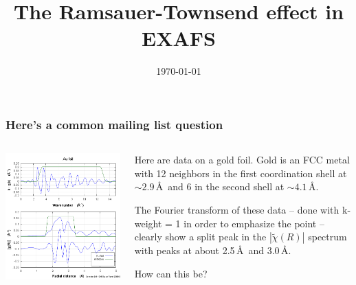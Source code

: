 \documentclass[10pt, xcolor=x11names, compress]{beamer}
\title{The Ramsauer-Townsend effect in EXAFS}
\date{\today}
\begin{document}
\maketitle


\begin{frame}
  \frametitle{Here's a common mailing list question}

  \begin{columns}[T]
    \begin{column}{0.5\linewidth}
      \includegraphics[width=\linewidth]{Au_rk.png}
    \end{column}
    \begin{column}{0.5\linewidth}
      Here are data on a gold foil.  Gold is an FCC metal with 12
      neighbors in the first coordination shell at $\sim2.9$\,\AA\
      and 6 in the second shell at $\sim4.1$\,\AA.

      \bigskip

      The Fourier transform of these data -- done with k-weight = 1 in
      order to emphasize the point -- clearly show a split peak in the
      $|\tilde\chi(R)|$ spectrum with peaks at about 2.5\,\AA\ and
      3.0\,\AA.

      \bigskip

      \begin{alertblock}{}
        \centering How can this be?
      \end{alertblock}
    \end{column}
  \end{columns}
\end{frame}
\end{document}
